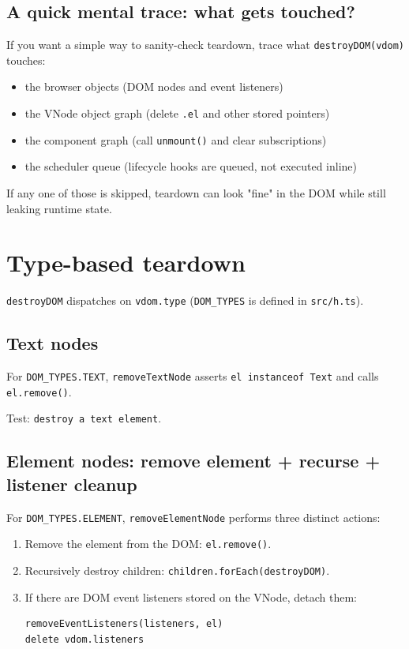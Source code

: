 \subsection{A quick mental trace: what gets touched?}

If you want a simple way to sanity-check teardown, trace what \texttt{destroyDOM(vdom)} touches:

\begin{itemize}
  \item the browser objects (DOM nodes and event listeners)
  \item the VNode object graph (delete \texttt{.el} and other stored pointers)
  \item the component graph (call \texttt{unmount()} and clear subscriptions)
  \item the scheduler queue (lifecycle hooks are queued, not executed inline)
\end{itemize}

If any one of those is skipped, teardown can look "fine" in the DOM while still leaking runtime state.

\section{Type-based teardown}

\texttt{destroyDOM} dispatches on \texttt{vdom.type} (\texttt{DOM\_TYPES} is defined in \texttt{src/h.ts}).

\subsection{Text nodes}

For \texttt{DOM\_TYPES.TEXT}, \texttt{removeTextNode} asserts \texttt{el instanceof Text} and calls \texttt{el.remove()}.

Test: \texttt{destroy a text element}.

\subsection{Element nodes: remove element + recurse + listener cleanup}

For \texttt{DOM\_TYPES.ELEMENT}, \texttt{removeElementNode} performs three distinct actions:

\begin{enumerate}
  \item Remove the element from the DOM: \texttt{el.remove()}.
  \item Recursively destroy children: \texttt{children.forEach(destroyDOM)}.
  \item If there are DOM event listeners stored on the VNode, detach them:
    \begin{verbatim}
removeEventListeners(listeners, el)
delete vdom.listeners
    \end{verbatim}
\end{enumerate}

